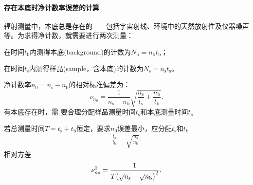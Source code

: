 \paragraph{存在本底时净计数率误差的计算}辐射测量中，本底总是存在的——包括宇宙射线、环境中的天然放射性及仪器噪声等。为求得净计数，就需要进行两次测量：
\begin{compactitem}
	\item 在时间$t_\mathrm b$内测得本底(background)的计数为$N_\mathrm b = n_\mathrm bt_\mathrm b$；
	\item 在时间$t_\mathrm s$内测得样品(sample，含本底)的计数为$N_\mathrm s = n_\mathrm st_\mathrm s$。
\end{compactitem}
净计数率$n_0 = n_\mathrm s - n_\mathrm b$的相对标准偏差为：
\begin{equation}\label{eq:nrd-background-subtraction-uncertainty}
	\nu_{n_0} = \frac1{n_\mathrm s - n_\mathrm b}\sqrt{\frac{n_\mathrm s}{t_\mathrm s} + \frac{n_\mathrm b}{t_\mathrm b}}.
\end{equation}
有本底存在时，需 要合理分配样品测量时间$t_\mathrm s$和本底测量时间$t_\mathrm b$

若总测量时间$T = t_\mathrm s + t_\mathrm b$恒定，要求$n_0$误差最小，应分配$t_\mathrm s$和$t_\mathrm b$
\begin{align}
	\frac{t_\mathrm s}{t_\mathrm b} = \sqrt{\frac{n_\mathrm s}{n_\mathrm b}}.
\end{align}
相对方差
\begin{align}
	\nu_{n_0}^2 = \frac1{T\bigl(\sqrt{n_\mathrm s} - \sqrt{n_\mathrm b}\bigr)^2}.
\end{align}

